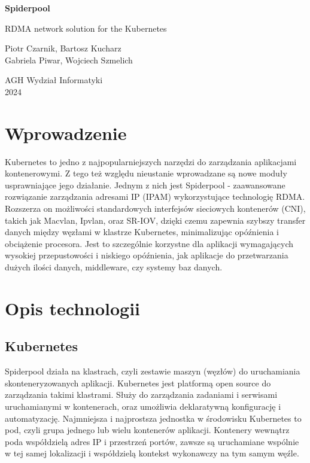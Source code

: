 \documentclass[onecolumn,12pt]{article}
\begin{document}
\begin{titlepage}
\begin{center}
\vspace*{2.5cm}
\Huge
\textbf{Spiderpool}
            
\vspace{0.5cm}
\LARGE
RDMA network solution for the Kubernetes
            
\vspace{1.5cm}

\large
Piotr Czarnik, Bartosz Kucharz
\\Gabriela Piwar, Wojciech Szmelich
              
\vspace{0.8cm}          
\Large
AGH Wydział Informatyki\\
2024    
\end{center}
\end{titlepage}

\tableofcontents
\thispagestyle{empty}
\newpage

\section{Wprowadzenie}
Kubernetes to jedno z najpopularniejszych narzędzi do zarządzania aplikacjami kontenerowymi. 
Z tego też względu nieustanie wprowadzane są nowe moduły usprawniające jego działanie. 
Jednym z nich jest Spiderpool - zaawansowane rozwiązanie zarządzania adresami IP (IPAM) wykorzystujące technologię RDMA.
Rozszerza on możliwości standardowych interfejsów sieciowych kontenerów (CNI), takich jak Macvlan, Ipvlan, oraz SR-IOV, 
dzięki czemu zapewnia  szybszy transfer danych między węzłami w klastrze Kubernetes, minimalizując opóźnienia i obciążenie procesora. 
Jest to szczególnie korzystne dla aplikacji wymagających wysokiej przepustowości i niskiego opóźnienia, 
jak aplikacje do przetwarzania dużych ilości danych, middleware, czy systemy baz danych.

\section{Opis technologii}
\subsection{Kubernetes}
Spiderpool działa na klastrach, czyli zestawie maszyn (węzłów) do uruchamiania skonteneryzowanych aplikacji. Kubernetes jest platformą open source do zarządzania takimi klastrami. Służy do zarządzania zadaniami i serwisami uruchamianymi w kontenerach, oraz umożliwia deklaratywną konfigurację i automatyzację. Najmniejsza i najprostsza jednostka w środowisku Kubernetes to pod, czyli grupa jednego lub wielu kontenerów aplikacji. Kontenery wewnątrz poda współdzielą adres IP i przestrzeń portów, zawsze są uruchamiane wspólnie w tej samej lokalizacji i współdzielą kontekst wykonawczy na tym samym węźle.
\end{document}
